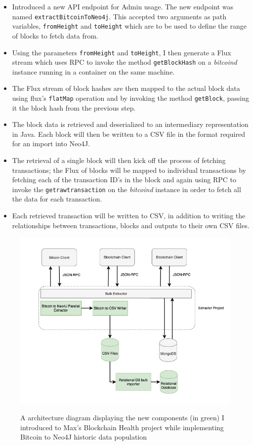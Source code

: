 \begin{itemize}
    \item Introduced a new API endpoint for Admin usage. The new endpoint was named \texttt{extractBitcoinToNeo4j}. This accepted two arguments as path variables, \texttt{fromHeight} and \texttt{toHeight} which are to be used to define the range of blocks to fetch data from. 
    \item Using the parameters \texttt{fromHeight} and \texttt{toHeight}, I then generate a Flux stream which uses RPC to invoke the method \texttt{getBlockHash} on a \textit{bitcoind} instance running in a container on the same machine. 
    \item The Flux stream of block hashes are then mapped to the actual block data using flux's \texttt{flatMap} operation and by invoking the method \texttt{getBlock}, passing it the block hash from the previous step. 
    \item The block data is retrieved and deserialized to an intermediary representation in Java. Each block will then be written to a CSV file in the format required for an import into Neo4J. 
    \item The retrieval of a single block will then kick off the process of fetching transactions; the Flux of blocks will be mapped to individual transactions by fetching each of the transaction ID's in the block and again using RPC to invoke the \texttt{getrawtransaction} on the \textit{bitcoind} instance in order to fetch all the data for each transaction. 
    \item Each retrieved transaction will be written to CSV, in addition to writing the relationships between transactions, blocks and outputs to their own CSV files. 
\end{itemize}

\begin{figure}[h!]
  \centering
  \includegraphics[width = 15cm]{./figures/adding-bitcoin-extractor-diagram}\\[0.5cm] 
  \caption{A architecture diagram displaying the new components (in green) I introduced to Max's Blockchain Health project while implementing Bitcoin to Neo4J historic data population}
  \label{fig:neo4j-layout}
\end{figure}


